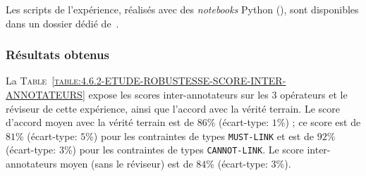 			\begin{leftBarInformation}
				Les scripts de l'expérience, réalisés avec des \textit{notebooks} Python (\cite{van-rossum-drake:2009:python-reference-manual}), sont disponibles dans un dossier dédié de~\cite{schild:2021:cognitivefactory-interactiveclusteringcomparativestudy}.
			\end{leftBarInformation}
			
		\subsubsection{Résultats obtenus}
		
		
			La \textsc{Table~\ref{table:4.6.2-ETUDE-ROBUSTESSE-SCORE-INTER-ANNOTATEURS}} expose les scores inter-annotateurs sur les $3$ opérateurs et le réviseur de cette expérience, ainsi que l'accord avec la vérité terrain.
			Le score d'accord moyen avec la vérité terrain est de $86$\% (écart-type: $1$\%) ; ce score est de $81$\% (écart-type: $5$\%) pour les contraintes de types \texttt{MUST-LINK} et est de $92$\% (écart-type: $3$\%) pour les contraintes de types \texttt{CANNOT-LINK}.
			Le score inter-annotateurs moyen (sans le réviseur) est de $84$\% (écart-type: $3$\%).
			
